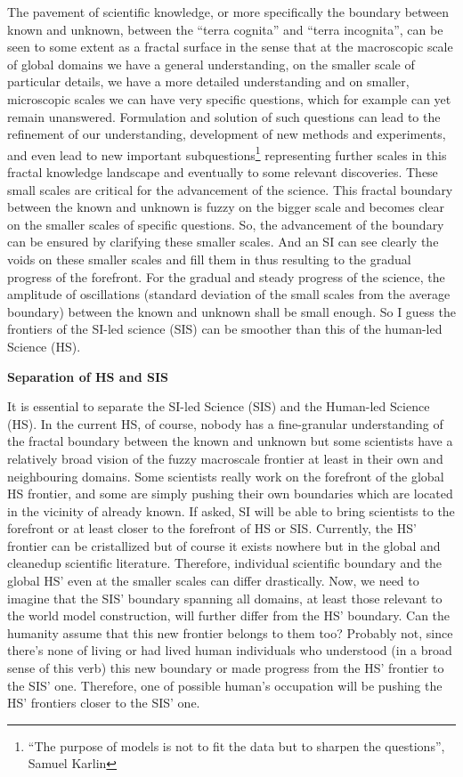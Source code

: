 \documentclass[a4paper,11pt]{article}
\begin{document}
    The pavement of scientific knowledge, or more specifically the boundary between known and unknown, between the ``terra cognita'' and ``terra incognita'', can be seen to some extent as a fractal surface in the sense that at the macroscopic scale of global domains we have a general understanding, on the smaller scale of particular details, we have a more detailed understanding and on smaller, microscopic scales we can have very specific questions, which for example can yet remain unanswered. Formulation and solution of such questions can lead to the refinement of our understanding, development of new methods and experiments, and even lead to new important subquestions\footnote{``The purpose of
models is not to fit the data but to sharpen the questions'', Samuel Karlin} representing further scales in this fractal knowledge landscape and eventually to some relevant discoveries. These small scales are critical for the advancement of the science. This fractal boundary between the known and unknown is fuzzy on the bigger scale and becomes clear on the smaller scales of specific questions. So, the advancement of the boundary can be ensured by clarifying these smaller scales. And an SI can see clearly the voids on these smaller scales and fill them in thus resulting to the gradual progress of the forefront. For the gradual and steady progress of the science, the amplitude of oscillations (standard deviation of the small scales from the average boundary) between the known and unknown shall be small enough. So I guess the frontiers of the SI-led science (SIS) can be smoother than this of the human-led Science (HS).

\textbf{Separation of HS and SIS}

It is essential to separate the SI-led Science (SIS) and the Human-led Science (HS). In the current HS, of course, nobody has a fine-granular understanding of the fractal boundary between the known and unknown but some scientists have a relatively broad vision of the fuzzy macroscale frontier at least in their own and neighbouring domains. Some scientists really work on the forefront of the global HS frontier, and some are simply pushing their own boundaries which are located in the vicinity of already known. If asked, SI will be able to bring scientists to the forefront or at least closer to the forefront of HS or SIS. Currently, the HS' frontier can be cristallized but of course it exists nowhere but in the global and cleanedup scientific literature. Therefore, individual scientific boundary and the global HS' even at the smaller scales can differ drastically. Now, we need to imagine that the SIS' boundary spanning all domains, at least those relevant to the world model construction, will further differ from the HS' boundary. Can the humanity assume that this new frontier belongs to them too? Probably not, since there's none of living or had lived human individuals who understood (in a broad sense of this verb) this new boundary or made progress from the HS' frontier to the SIS' one. Therefore, one of possible human's occupation will be pushing the HS' frontiers closer to the SIS' one.
\end{document}
